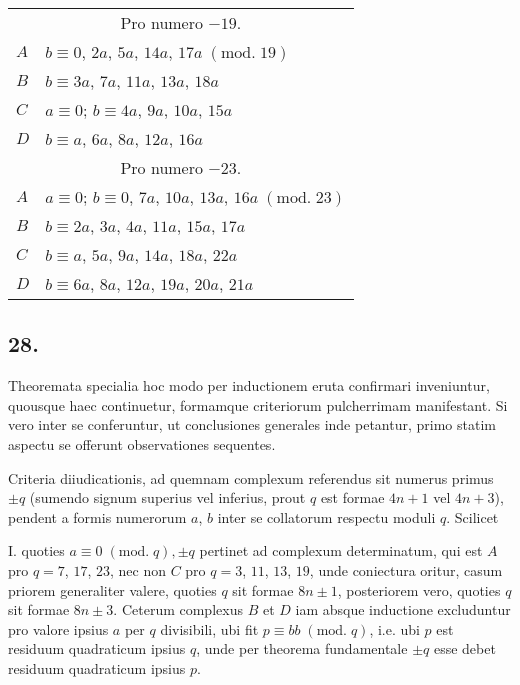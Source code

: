 \documentclass[twoside,12pt, showframe]{memoir}
\renewcommand{\pmod}[1]{\;(\textrm{mod.}\;#1)}
\begin{document}
\begin{center}
\begin{tabular}{l|l}
\multicolumn{2}{c}{Pro numero \(-19\).}\\
\(A\) & \(b \equiv 0\), \(2 a\), \(5 a\), \(14 a\), \(17 a\pmod{19} \)\\
\(B\) & \(b \equiv 3 a\), \(7 a\), \(11 a\), \(13 a\), \(18 a \)\\
\(C\) & \(a \equiv 0\); \(b \equiv 4 a\), \(9 a\), \(10 a\), \(15 a \)\\
\(D\) & \(b \equiv a\), \(6 a\), \(8 a\), \(12 a\), \(16 a\)\\
\multicolumn{2}{c}{Pro numero \(-23\).}\\
\(A\) & \(a \equiv 0\); \(b \equiv 0\), \(7 a\), \(10 a\), \(13 a\), \(16 a\pmod{23} \)\\
\(B\) & \(b \equiv 2 a\), \(3 a\), \(4 a\), \(11 a\), \(15 a\), \(17 a \)\\
\(C\) & \(b \equiv a\), \(5 a\), \(9 a\), \(14 a\), \(18 a\), \(22 a \)\\
\(D\) & \(b \equiv 6 a\), \(8 a\), \(12 a\), \(19 a\), \(20 a\), \(21 a\)
\end{tabular}
\end{center}

\subsection*{28.}
 
Theoremata specialia hoc modo per inductionem eruta confirmari inveniuntur, quousque haec continuetur, formamque criteriorum pulcherrimam manifestant. Si vero inter se conferuntur, ut conclusiones generales inde petantur, primo statim aspectu se offerunt observationes sequentes.

Criteria diiudicationis, ad quemnam complexum referendus sit numerus primus \(\pm q\) (sumendo signum superius vel inferius, prout \(q\) est formae \(4 n+1\) vel \(4 n+3\)), pendent a formis numerorum \(a\), \(b\) inter se collatorum respectu moduli \(q\). Scilicet
 
I. quoties \(a \equiv 0\pmod{q}, \pm q\) pertinet ad complexum determinatum, qui est \(A\) pro \(q=7\), \(17\), \(23\), nec non \(C\) pro \(q=3\), \(11\), \(13\), \(19\), unde coniectura oritur, casum priorem generaliter valere, quoties \(q\) sit formae \(8 n \pm 1\), posteriorem vero, quoties \(q\) sit formae \(8 n \pm 3\). Ceterum complexus \(B\) et \(D\) iam absque inductione excluduntur pro valore ipsius \(a\) per \(q\) divisibili, ubi fit \(p \equiv b b \pmod{q}\), i.e. ubi \(p\) est residuum quadraticum ipsius \(q\), unde per theorema fundamentale \(\pm q\) esse debet residuum quadraticum ipsius \(p\).
 
\end{document}
